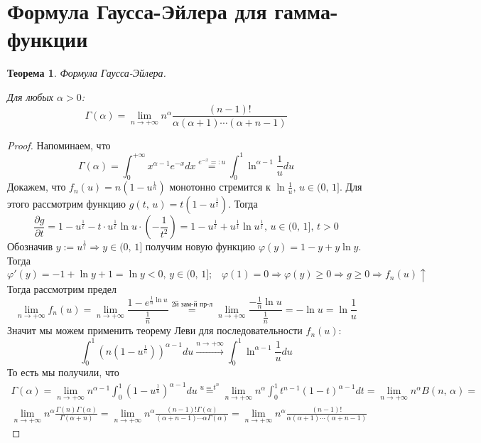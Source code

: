 \documentclass[a4paper,12pt]{article}
\renewcommand{\phi}{\ensuremath{\varphi}}
\renewcommand{\geq}{\ensuremath{\geqslant}}
\theoremstyle{plain}
\newtheorem{theorem}{Теорема}[section]
\theoremstyle{definition}
\theoremstyle{remark}
\begin{document}
\section{Формула Гаусса-Эйлера для гамма-функции}
\begin{theorem}
	Формула Гаусса-Эйлера.

	Для любых $\alpha > 0$:
	\[\Gamma(\alpha) = \lim_{n \to +\infty}n^\alpha \frac{(n - 1)!}{\alpha(\alpha + 1)\cdots (\alpha + n - 1)}\]
\end{theorem}
\begin{proof}
	Напоминаем, что
	\[
		\Gamma(\alpha) = \int_0^{+\infty}x^{\alpha - 1}e^{-x}dx \stackrel{e^{-x} =: u}{=} \int_0^1 \ln^{\alpha - 1}\frac{1}{u}du
	\]
	Докажем, что $f_n(u) = n(1 - u^{\frac{1}{n}})$ монотонно стремится к $\ln\frac{1}{u},\, u \in (0,\,1]$. Для этого рассмотрим функцию $g(t,\,u) = t(1 - u^{\frac{1}{t}})$. Тогда
	\[\frac{\partial g}{\partial t} = 1 - u^{\frac{1}{t}} - t\cdot u^{\frac{1}{t}}\ln u\cdot (-\frac{1}{t^2}) = 1 - u^{\frac{1}{t}} + u^{\frac{1}{t}}\ln u^{\frac{1}{t}},\, u \in (0,\,1],\, t > 0\]
	Обозначив $y := u^{\frac{1}{t}} \Rightarrow y \in (0,\,1]$ получим новую функцию $\phi(y) = 1 - y + y\ln y$. Тогда
	\[\phi'(y) = -1 + \ln y + 1 = \ln y < 0,\, y \in (0,\,1];\;\;\; \phi(1) = 0 \Rightarrow \phi(y) \geq 0 \Rightarrow g \geq 0 \Rightarrow f_n(u) \uparrow\]
	Тогда рассмотрим предел
	\[\lim_{n \to +\infty} f_n(u) = \lim_{n \to +\infty} \frac{1 - e^{\frac{1}{n}\ln u}}{\frac{1}{n}} \stackrel{\text{2й зам-й пр-л}}{=} \lim_{n \to +\infty}\frac{-\frac{1}{n}\ln u}{\frac{1}{n}} = -\ln u = \ln\frac{1}{u}\]
	Значит мы можем применить теорему Леви для последовательности $f_n(u)$:
	\[\int_0^1 (n(1 - u^{\frac{1}{n}}))^{\alpha - 1}du \stackrel{n \to +\infty}{\to} \int_0^1 \ln^{\alpha - 1}\frac{1}{u}du\]
	То есть мы получили, что
	\begin{align*}
		\Gamma(\alpha) = \lim_{n \to +\infty} n^{\alpha - 1}\int_0^1 (1 - u^{\frac{1}{n}})^{\alpha - 1}du \stackrel{u = t^n}{=} \lim_{n \to +\infty}n^\alpha \int_0^1 t^{n - 1}(1 - t)^{\alpha - 1}dt = \lim_{n \to +\infty} n^\alpha B(n,\,\alpha) = \\
		\lim_{n \to +\infty} n^\alpha \frac{\Gamma(n)\Gamma(\alpha)}{\Gamma(\alpha + n)} = \lim_{n \to +\infty}n^\alpha \frac{(n - 1)!\Gamma(\alpha)}{(\alpha + n - 1)\cdots\alpha\Gamma(\alpha)} = \lim_{n \to +\infty}n^\alpha \frac{(n - 1)!}{\alpha(\alpha + 1)\cdots (\alpha + n - 1)}
	\end{align*}
\end{proof}
\end{document}
